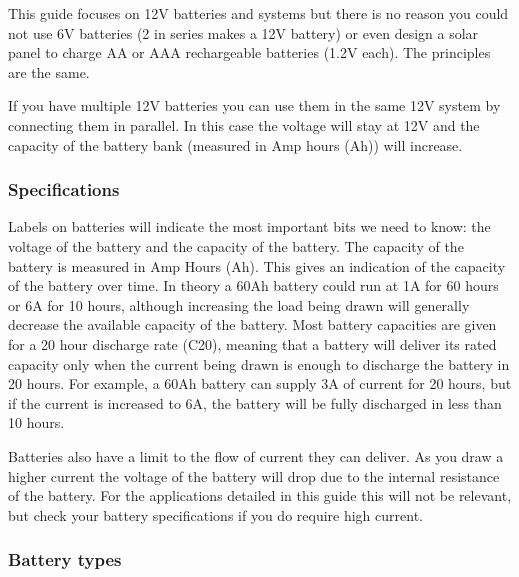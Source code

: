 \documentclass{article}
\theoremstyle{definition}
\theoremstyle{definition}
\theoremstyle{remark}
\begin{document}
    This guide focuses on 12V batteries and systems but there is no reason you could not use 6V batteries (2 in series makes a 12V battery) or even design a solar panel to charge AA or AAA rechargeable batteries (1.2V each). The principles are the same. 

    If you have multiple 12V batteries you can use them in the same 12V system by connecting them in parallel. In this case the voltage will stay at 12V and the capacity of the battery bank (measured in Amp hours (Ah)) will increase. 
  
    \subsubsection{Specifications} %
    \label{ssub:specifications}

      Labels on batteries will indicate the most important bits we need to know: the voltage of the battery and the capacity of the battery. The capacity of the battery is measured in Amp Hours (Ah). This gives an indication of the capacity of the battery over time. In theory a 60Ah battery could run at 1A for 60 hours or 6A for 10 hours, although increasing the load being drawn will generally decrease the available capacity of the battery. Most battery capacities are given for a 20 hour discharge rate (C20), meaning that a battery will deliver its rated capacity only when the current being drawn is enough to discharge the battery in 20 hours. For example, a 60Ah battery can supply 3A of current for 20 hours, but if the current is increased to 6A, the battery will be fully discharged in less than 10 hours.

      Batteries also have a limit to the flow of current they can deliver. As you draw a higher current the voltage of the battery will drop due to the internal resistance of the battery. For the applications detailed in this guide this will not be relevant, but check your battery specifications if you do require high current.
    

    \subsubsection{Battery types} %
    \label{ssub:battery_types}
\end{document}
